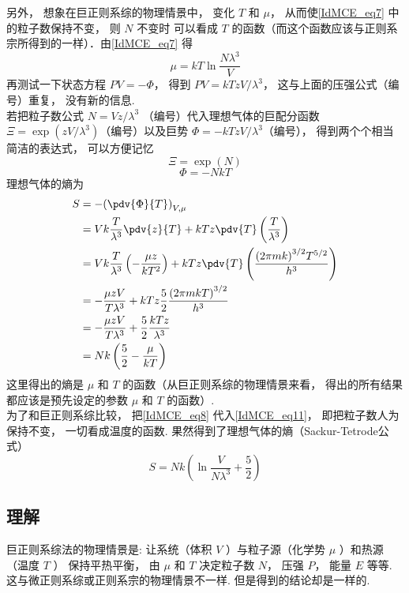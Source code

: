 另外， 想象在巨正则系综的物理情景中， 变化 $T$ 和 $\mu $，  从而使\autoref{IdMCE_eq7} 中的粒子数保持不变， 则 $N$ 不变时 可以看成 $T$ 的函数（而这个函数应该与正则系宗所得到的一样）．由\autoref{IdMCE_eq7} 得
\begin{equation}\label{IdMCE_eq8}
\mu  = kT\ln \frac{N{\lambda ^3}}{V}
\end{equation}
再测试一下状态方程 $PV =  - \Phi $，  得到 $PV = kT{zV}/{\lambda ^3}$，  这与上面的压强公式（编号）重复， 没有新的信息.\\
若把粒子数公式 $N = {Vz}/{\lambda ^3}$ （编号）代入理想气体的巨配分函数 $\Xi  = \exp \left( {{zV}/{\lambda ^3}} \right)$（编号）以及巨势 $\Phi  =  - kT{zV}/{\lambda ^3}$（编号）， 得到两个个相当简洁的表达式， 可以方便记忆
\begin{equation}\label{IdMCE_eq9}
\Xi  = \exp \left( N \right)
\end{equation}
\begin{equation}\label{IdMCE_eq10}
\Phi  =  - NkT
\end{equation}
理想气体的熵为
\begin{equation}\label{IdMCE_eq11}
\begin{aligned}
S &=  - {\left( {\pdv{\Phi}{T}} \right)_{V,\mu }} \\
& = Vk\frac{T}{\lambda ^3}\pdv{z}{T} + kTz\pdv{T} \left( {\frac{T}{\lambda ^3}} \right) \\
& = Vk\frac{T}{\lambda ^3}\left( { - \frac{\mu z}{k{T^2}}} \right) + kTz\pdv{T}\left( {\frac{{{(2\pi mk)}^{3/2}}{T^{5/2}}}{h^3}} \right)\\
& =  - \frac{\mu zV}{T{\lambda ^3}} + kTz\frac{5}{2}\frac{{(2\pi mkT)}^{3/2}}{h^3} \\
& =  - \frac{\mu zV}{T{\lambda ^3}} + \frac{5}{2}\frac{kTz}{\lambda ^3} \\
& = Nk\left( {\frac{5}{2} - \frac{\mu }{kT}} \right){\kern 1pt} {\kern 1pt} {\kern 1pt} {\kern 1pt} {\kern 1pt} {\kern 1pt} {\kern 1pt}
\end{aligned}
\end{equation}
这里得出的熵是 $\mu $ 和 $T$ 的函数（从巨正则系综的物理情景来看， 得出的所有结果都应该是预先设定的参数 $\mu $ 和 $T$ 的函数）.\\
为了和巨正则系综比较， 把\autoref{IdMCE_eq8} 代入\autoref{IdMCE_eq11}，  即把粒子数人为保持不变， 一切看成温度的函数. 果然得到了理想气体的熵（Sackur-Tetrode公式）
\begin{equation}\label{IdMCE_eq12}
S = Nk\left( {\ln \frac{V}{N{\lambda ^3}} + \frac{5}{2}} \right)
\end{equation}

\subsection{理解}

巨正则系综法的物理情景是: 让系统（体积 $V$ ）与粒子源（化学势 $\mu $ ）和热源（温度 $T$ ） 保持平热平衡， 由 $\mu $ 和 $T$ 决定粒子数 $N$，  压强 $P$，  能量 $E$ 等等. 这与微正则系综或正则系宗的物理情景不一样. 但是得到的结论却是一样的.

